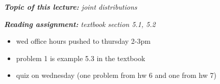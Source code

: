 \documentclass[10pt]{article}
\theoremstyle{definition}
\newcommand{\1}[1]{\textbf{1}_{\left[#1\right]}} %
\begin{document}
\begin{center}
  \begin{tcolorbox}[width=0.9\textwidth, colback=white, colframe=black]
    \textit{\textbf{Topic of this lecture:} joint distributions}

    \textit{\textbf{Reading assignment:} textbook section 5.1, 5.2}
  \end{tcolorbox}
\end{center}

\begin{itemize}
  \item wed office hours pushed to thursday 2-3pm
  \item problem 1 is example 5.3 in the textbook
  \item quiz on wednesday (one problem from hw 6 and one from hw 7)
\end{itemize}
\end{document}
